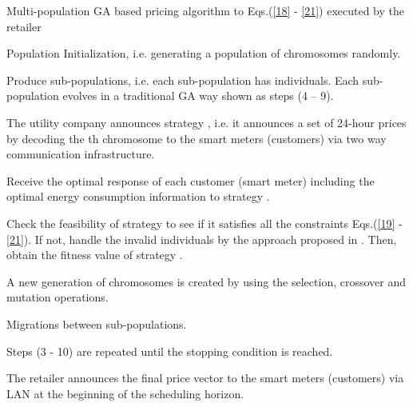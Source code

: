 \documentclass[10pt,journal]{IEEEtran}
\theoremstyle{definition}
\theoremstyle{plain} \newtheorem{theo}{Theorem} \newtheorem{prop}{Proposition}  \newtheorem{lemm}{Lemma}
\begin{document}
\begin{algorithm}[!t]

\renewcommand{\algorithmicrequire}{\textbf{}}



\caption{Multi-population GA based pricing algorithm to Eqs.(\ref{18} - \ref{21}) executed by the retailer}
\label{Algorithm:GA based decision-making scheme algorithm}

\begin{algorithmic}[1]

\STATE Population Initialization, i.e. generating a population of  chromosomes randomly. 

\STATE Produce  sub-populations, i.e. each sub-population has  individuals.
\STATE Each sub-population evolves in a traditional GA way shown as steps (4 -- 9).

\STATE The utility company announces strategy , i.e. it announces a set of 24-hour prices by decoding the th chromosome to the smart meters (customers) via two way communication infrastructure.

\STATE Receive the optimal response of each customer  (smart meter) including the optimal energy consumption information to strategy .

\STATE Check the feasibility of strategy  to see if it satisfies all the constraints Eqs.(\ref{19} - \ref{21}). If not, handle the invalid individuals by the approach proposed in \cite{deb2000efficient}. Then, obtain the fitness value of  strategy . 
\ENDFOR

\STATE A new generation of chromosomes is created by using the selection, crossover and mutation operations.

\STATE Migrations between sub-populations.

\STATE Steps (3 - 10) are repeated until the stopping condition is
reached.

\STATE The retailer announces the final price vector to the smart meters (customers) via LAN at the beginning of the scheduling horizon.
\end{algorithmic}
\end{algorithm}
\end{document}
